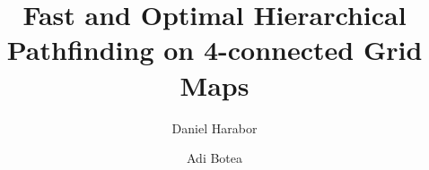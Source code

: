 \documentclass{ecai2010}
\begin{document}
\title{Fast and Optimal Hierarchical Pathfinding on 4-connected Grid Maps}
\author{
Daniel Harabor 
\and 
Adi Botea 
}

\maketitle




 








\end{document}
